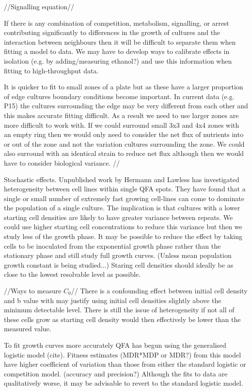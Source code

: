 //Signalling equation//

If there is any combination of competition, metabolism, signalling, or
arrest contributing significantly to differences in the growth of
cultures and the interaction between neighbours then it will be
difficult to separate them when fitting a model to data. We may have
to develop ways to calibrate effects in isolation (e.g. by
adding/measuring ethanol?) and use this information when fitting to
high-throughput data.

It is quicker to fit to small zones of a plate but as these have a
larger proportion of edge cultures boundary conditions become
important. In current data (e.g. P15) the cultures surrounding the
edge may be very different from each other and this makes accurate
fitting difficult. As a result we need to use larger zones are more
difficult to work with. If we could surround small 3x3 and 4x4 zones
with an empty ring then we would only need to consider the net flux of
nutrients into or out of the zone and not the variation cultures
surrounding the zone. We could also surround with an identical strain
to reduce net flux although then we would have to consider biological
variance.
//

Stochastic effects. Unpublished work by Hermann and Lawless has
investigated heterogeneity between cell lines within single QFA
spots. They have found that a single or small number of extremely fast
growing cell-lines can come to dominate the population of a single
culture. The implication is that cultures with a lower starting cell
densities are likely to have greater variance between repeats. We
could use higher starting cell concentrations to reduce this variance
but then we study less of the growth phase. It may be possible to
reduce the effect by taking cells to be inoculated from the
exponential growth phase rather than the stationary phase and still
study full growth curves. (Unless mean population growth constant is
being studied...) Staring cell densities should ideally be as close to
the lowest resolvable level as possible.

//Ways to measure \(C_{0}\)// There is a confounding effect between
initial cell density and b value with may justify using initial cell
densities slightly above the minimum detectable level. There is still
the issue of heterogeneity if not all of these cells grow as starting
cell density would then effectively be lower than the measured value.

To fit growth curves more accurately QFA has begun using the
generalised logistic model (cite). Fitness estimates (MDR*MDP or MDR?)
from this model have higher coefficient of variation than those from
either the standard logistic or competition model. (accuracy and
precision?) Although the fits to data are qualitatively worse, it may
be advisable to revert to the standard logistic model.


